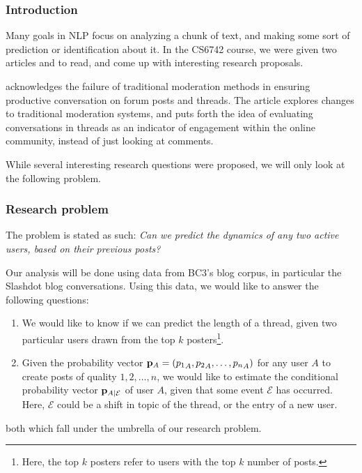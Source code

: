 \documentclass[a4paper,12pt]{article}
\numberwithin{equation}{section}
\begin{document}
 

\subsubsection*{Introduction}

% 


Many goals in NLP focus on analyzing a chunk of text, and making some sort of prediction or identification about it. In the CS6742 course, we were given two articles \cite{dejareview} and \cite{anae} to read, and come up with interesting research proposals. 

\cite{anae} acknowledges the failure of traditional moderation methods in ensuring productive conversation on forum posts and threads. The article explores changes to traditional moderation systems, and puts forth the idea of evaluating conversations in threads as an indicator of engagement within the online community, instead of just looking at comments.

While several interesting research questions were proposed, we will only look at the following problem.

\subsubsection*{Research problem}

The problem is stated as such: {\it Can we predict the dynamics of any two active users, based on their previous posts?}

Our analysis will be done using data from BC3's blog corpus, in particular the Slashdot blog conversations. Using this data, we would like to answer the following questions:
\vspace*{-0.5cm}
\begin{enumerate}
\item We would like to know if we can predict the length of a thread, given two particular users drawn from the top $k$ posters\footnote{Here, the top $k$ posters refer to users with the top $k$ number of posts.}. 
\item Given the probability vector ${\bf p}_A = ({p_1}_A, {p_2}_A,\hdots, {p_n}_A)$ for any user $A$ to create posts of quality $1,2,\hdots, n$, we would like to estimate the conditional probability vector ${\bf p}_{A|\mathcal E}$ of user $A$, given that some event $\mathcal E$ has occurred. Here, $\mathcal E$ could be a shift in topic of the thread, or the entry of a new user.
\end{enumerate}
both which fall under the umbrella of our research problem.
\end{document}
